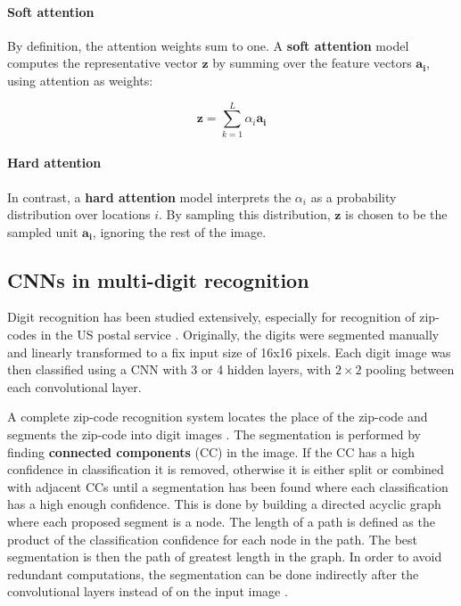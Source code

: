 \paragraph{Soft attention}
By definition, the attention weights sum to one. A \textbf{soft attention} model computes the representative vector $\mathbf{z}$ by summing over the feature vectors $\mathbf{a_i}$, using attention as weights:

\[
\mathbf{z} = \sum_{k=1}^L \alpha_i \mathbf{a_i}
\]

\paragraph{Hard attention}
In contrast, a \textbf{hard attention} model interprets the ${\alpha_i}$ as a probability distribution over locations $i$. By sampling this distribution, $\mathbf{z}$ is chosen to be the sampled unit $\mathbf{a_i}$, ignoring the rest of the image.


\subsection{CNNs in multi-digit recognition}

Digit recognition has been studied extensively, especially for recognition of zip-codes in the US postal service \cite{lecun_1989, lecun_1990}. Originally, the digits were segmented manually and linearly transformed to a fix input size of 16x16 pixels.
Each digit image was then classified using a CNN with 3 or 4 hidden layers, with $2 \times 2$ pooling between each convolutional layer.

A complete zip-code recognition system locates the place of the zip-code and segments the zip-code into digit images \cite{zipcode_system}. The segmentation is performed by finding \textbf{connected components} (CC) in the image. If the CC has a high confidence in classification it is removed, otherwise it is either split or combined with adjacent CCs until a segmentation has been found where each classification has a high enough confidence. This is done by building a directed acyclic graph where each proposed segment is a node. The length of a path is defined as the product of the classification confidence for each node in the path. The best segmentation is then the path of greatest length in the graph. In order to avoid redundant computations, the segmentation can be done indirectly after the convolutional layers instead of on the input image \cite{lecun_multidigit}.

